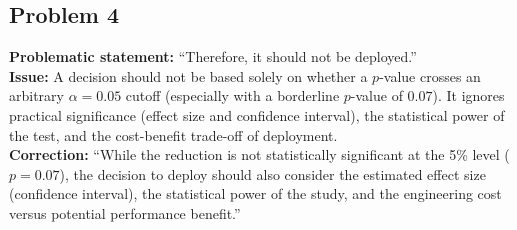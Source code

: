 \documentclass[11pt]{article}
\begin{document}
\subsection*{Problem 4}
\noindent\textbf{Problematic statement:} ``Therefore, it should not be deployed.''\\
\textbf{Issue:} A decision should not be based solely on whether a $p$-value crosses an arbitrary $\alpha = 0.05$ cutoff (especially with a borderline $p$-value of $0.07$). It ignores practical significance (effect size and confidence interval), the statistical power of the test, and the cost-benefit trade-off of deployment.\\
\textbf{Correction:} ``While the reduction is not statistically significant at the 5\% level ($p = 0.07$), the decision to deploy should also consider the estimated effect size (confidence interval), the statistical power of the study, and the engineering cost versus potential performance benefit.''
\end{document}

